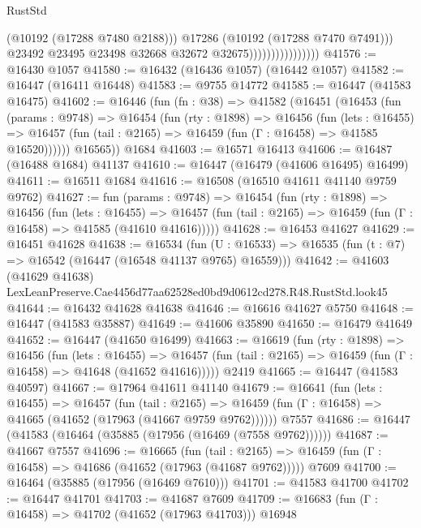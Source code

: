 \begin{lexlean}{RustStd}
\begin{coremodule}
                                        (@10192 (@17288 @7480 @2188)))
                                      @17286
                                      (@10192 (@17288 @7470 @7491)))
                                    @23492
                                    @23495
                                    @23498
                                    @32668
                                    @32672
                                    @32675))))))))))))))))
@41576 := @16430 @1057
@41580 := @16432 (@16436 @1057) (@16442 @1057)
@41582 := @16447 (@16411 @16448)
@41583 := @9755 @14772
@41585 := @16447 (@41583 @16475)
@41602 := @16446
    (fun (fn : @38) =>
    @41582
      (@16451
        (@16453
          (fun (params : @9748) =>
          @16454
            (fun (rty : @1898) =>
            @16456
              (fun (lets : @16455) =>
              @16457 (fun (tail : @2165) => @16459 (fun (Γ : @16458) => @41585 @16520))))))
        @16565))
    @1684
@41603 := @16571 @16413
@41606 := @16487 (@16488 @1684) @41137
@41610 := @16447 (@16479 (@41606 @16495) @16499)
@41611 := @16511 @1684
@41616 := @16508 (@16510 @41611 @41140 @9759 @9762)
@41627 := fun (params : @9748) =>
  @16454
    (fun (rty : @1898) =>
    @16456
      (fun (lets : @16455) =>
      @16457 (fun (tail : @2165) => @16459 (fun (Γ : @16458) => @41585 (@41610 @41616)))))
@41628 := @16453 @41627
@41629 := @16451 @41628
@41638 := @16534
    (fun (U : @16533) => @16535 (fun (t : @7) => @16542 (@16447 (@16548 @41137 @9765) @16559)))
@41642 := @41603
    (@41629 @41638)
    LexLeanPreserve.Cae4456d77aa62528ed0bd9d0612cd278.R48.RustStd.look45
@41644 := @16432 @41628 @41638
@41646 := @16616 @41627 @5750
@41648 := @16447 (@41583 @35887)
@41649 := @41606 @35890
@41650 := @16479 @41649
@41652 := @16447 (@41650 @16499)
@41663 := @16619
    (fun (rty : @1898) =>
    @16456
      (fun (lets : @16455) =>
      @16457 (fun (tail : @2165) => @16459 (fun (Γ : @16458) => @41648 (@41652 @41616)))))
    @2419
@41665 := @16447 (@41583 @40597)
@41667 := @17964 @41611 @41140
@41679 := @16641
    (fun (lets : @16455) =>
    @16457
      (fun (tail : @2165) =>
      @16459 (fun (Γ : @16458) => @41665 (@41652 (@17963 (@41667 @9759 @9762))))))
    @7557
@41686 := @16447 (@41583 (@16464 (@35885 (@17956 (@16469 (@7558 @9762))))))
@41687 := @41667 @7557
@41696 := @16665
    (fun (tail : @2165) => @16459 (fun (Γ : @16458) => @41686 (@41652 (@17963 (@41687 @9762)))))
    @7609
@41700 := @16464 (@35885 (@17956 (@16469 @7610)))
@41701 := @41583 @41700
@41702 := @16447 @41701
@41703 := @41687 @7609
@41709 := @16683 (fun (Γ : @16458) => @41702 (@41652 (@17963 @41703))) @16948

\end{coremodule}
\end{lexlean}
